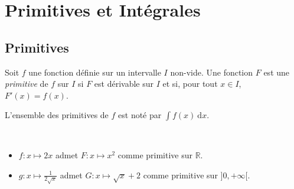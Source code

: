 
\TCDLessonStyleOn
\providecommand{\dx}{~\mathrm{d}x}
\providecommand{\dt}{~\mathrm{d}t}

\chapter{Primitives et Int\'egrales}
      \section{Primitives}
      \begin{defi}[Primitive]
            Soit $f$ une fonction d\'efinie sur un intervalle $I$ non-vide.
            Une fonction $F$ est une \emph{primitive} de $f$ sur $I$ si $F$ est d\'erivable sur $I$ et si, 
            pour tout $x\in I$, $F'(x)=f(x)$.

            
            L'ensemble des primitives de $f$ est not\'e par $\displaystyle{\int f(x) \dx}$.
            \begin{ex}~\\
                  \begin{itemize}
                        \item $f:x\mapsto 2x$ admet $F:x\mapsto x^2$ comme primitive sur $\mathbb{R}$.
                        \item $g:x\mapsto \frac{1}{2\sqrt{x}}$ admet $G:x\mapsto \sqrt{x} + 2$ 
                              comme primitive sur $]0,+\infty[$.
                  \end{itemize}
            \end{ex}
      \end{defi}
